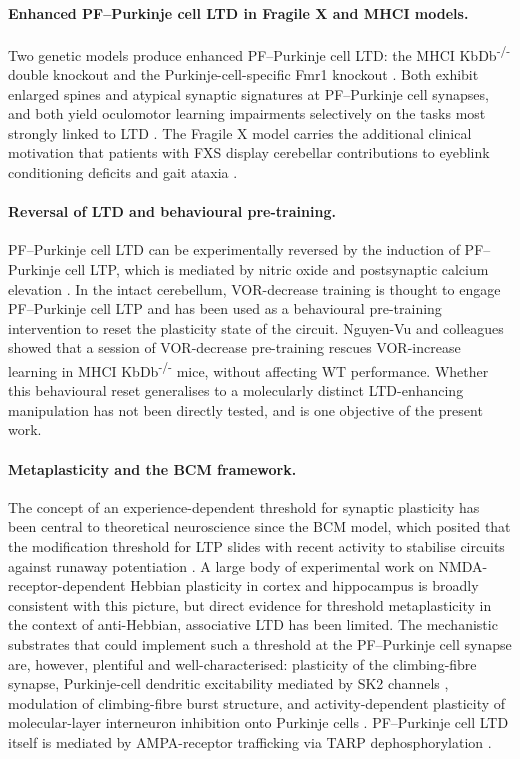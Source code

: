 \paragraph{Enhanced PF--Purkinje cell LTD in Fragile X and MHCI models.}
Two genetic models produce enhanced PF--Purkinje cell LTD: the MHCI KbDb\textsuperscript{-/-} double knockout and the Purkinje-cell-specific Fmr1 knockout \cite{koekkoek2005fmr1,nosyreva2006fmr1,nguyenvu2017saturation}. Both exhibit enlarged spines and atypical synaptic signatures at PF--Purkinje cell synapses, and both yield oculomotor learning impairments selectively on the tasks most strongly linked to LTD \cite{nguyenvu2017saturation,koekkoek2005fmr1}. The Fragile X model carries the additional clinical motivation that patients with FXS display cerebellar contributions to eyeblink conditioning deficits and gait ataxia \cite{koekkoek2005fmr1}.

\paragraph{Reversal of LTD and behavioural pre-training.}
PF--Purkinje cell LTD can be experimentally reversed by the induction of PF--Purkinje cell LTP, which is mediated by nitric oxide and postsynaptic calcium elevation \cite{levram2003reversing}. In the intact cerebellum, VOR-decrease training is thought to engage PF--Purkinje cell LTP and has been used as a behavioural pre-training intervention to reset the plasticity state of the circuit. Nguyen-Vu and colleagues \cite{nguyenvu2017saturation} showed that a session of VOR-decrease pre-training rescues VOR-increase learning in MHCI KbDb\textsuperscript{-/-} mice, without affecting WT performance. Whether this behavioural reset generalises to a molecularly distinct LTD-enhancing manipulation has not been directly tested, and is one objective of the present work.

\paragraph{Metaplasticity and the BCM framework.}
The concept of an experience-dependent threshold for synaptic plasticity has been central to theoretical neuroscience since the BCM model, which posited that the modification threshold for LTP slides with recent activity to stabilise circuits against runaway potentiation \cite{abraham1996metaplasticity}. A large body of experimental work on NMDA-receptor-dependent Hebbian plasticity in cortex and hippocampus is broadly consistent with this picture, but direct evidence for threshold metaplasticity in the context of anti-Hebbian, associative LTD has been limited. The mechanistic substrates that could implement such a threshold at the PF--Purkinje cell synapse are, however, plentiful and well-characterised: plasticity of the climbing-fibre synapse, Purkinje-cell dendritic excitability mediated by SK2 channels \cite{ohtsuki2012sk2}, modulation of climbing-fibre burst structure, and activity-dependent plasticity of molecular-layer interneuron inhibition onto Purkinje cells \cite{rowan2018graded}. PF--Purkinje cell LTD itself is mediated by AMPA-receptor trafficking via TARP dephosphorylation \cite{nomura2012stargazin}.

